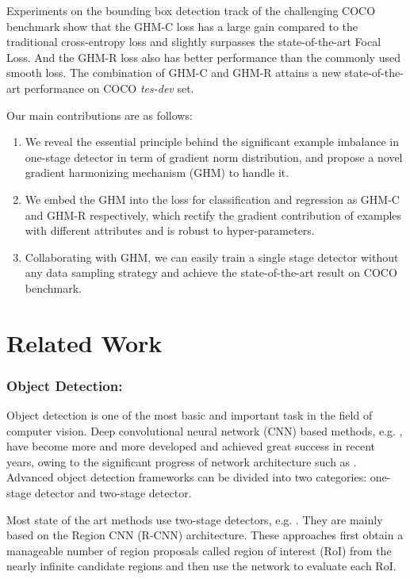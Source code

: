 \documentclass[letterpaper]{article} \usepackage{aaai19}  \usepackage{times}  \usepackage{helvet}  \usepackage{courier}  \usepackage{url}  \usepackage{graphicx}  \usepackage{amsmath,amssymb}
\begin{document}
Experiments on the bounding box detection track of the challenging COCO benchmark show that the GHM-C loss has a large gain compared to the traditional cross-entropy loss and slightly surpasses the state-of-the-art Focal Loss. And the GHM-R loss also has better performance than the commonly used smooth  loss. The combination of GHM-C and GHM-R attains a new state-of-the-art performance on COCO \textit{tes-dev} set.

Our main contributions are as follows:
\begin{enumerate}
\item We reveal the essential principle behind the significant example imbalance in one-stage detector in term of gradient norm distribution, and propose a novel gradient harmonizing mechanism (GHM) to handle it.
\item We embed the GHM into the loss for classification and regression as GHM-C and GHM-R respectively, which rectify the gradient contribution of examples with different attributes and is robust to hyper-parameters. 
\item Collaborating with GHM, we can easily train a single stage detector without any data sampling strategy and achieve the state-of-the-art result on COCO benchmark.
\end{enumerate}


\section{Related Work}

\subsubsection{Object Detection:}
Object detection is one of the most basic and important task in the field of computer vision. Deep convolutional neural network (CNN) based methods, e.g. \cite{faster,ssd,yolov2,mask}, have become more and more developed and achieved great success in recent years, owing to the significant progress of network architecture such as \cite{vgg,googlenet,resnet,densely}. Advanced object detection frameworks can be divided into two categories: one-stage detector and two-stage detector.

 Most state of the art methods use two-stage detectors, e.g. \cite{fast,faster,li2017zoom,mask,fpn,zeng2018crafting}. They are mainly based on the Region CNN (R-CNN) architecture. These approaches first obtain a manageable number of region proposals called region of interest (RoI) from the nearly infinite candidate regions and then use the network to evaluate each RoI. 
\end{document}
